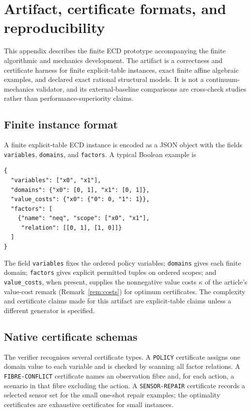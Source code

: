 \appendix
\section{Artifact, certificate formats, and reproducibility}
\label{app:artifact}

This appendix describes the finite ECD prototype accompanying the finite
algorithmic and mechanics development. The artifact is a correctness and
certificate harness for finite explicit-table instances, exact finite affine
algebraic examples, and declared exact rational structural models. It is not a
continuum-mechanics validator, and its external-baseline comparisons are
cross-check studies rather than performance-superiority claims.

\subsection{Finite instance format}

A finite explicit-table ECD instance is encoded as a JSON object with the fields
\texttt{variables}, \texttt{domains}, and \texttt{factors}. A typical Boolean
example is
\begin{verbatim}
{
  "variables": ["x0", "x1"],
  "domains": {"x0": [0, 1], "x1": [0, 1]},
  "value_costs": {"x0": {"0": 0, "1": 1}},
  "factors": [
    {"name": "neq", "scope": ["x0", "x1"],
     "relation": [[0, 1], [1, 0]]}
  ]
}
\end{verbatim}
The field \texttt{variables} fixes the ordered policy variables; \texttt{domains}
gives each finite domain; \texttt{factors} gives explicit permitted tuples on
ordered scopes; and \texttt{value\_costs}, when present, supplies the nonnegative
value costs \(\kappa\) of the article's value-cost remark (Remark~\ref{rem:costs})
for optimum certificates. The complexity and certificate claims made
for this artifact are explicit-table claims unless a different generator is
specified.

\subsection{Native certificate schemas}

The verifier recognises several certificate types. A \texttt{POLICY} certificate
assigns one domain value to each variable and is checked by scanning all factor
relations. A \texttt{FIBRE-CONFLICT} certificate names an observation fibre and,
for each action, a scenario in that fibre excluding the action. A
\texttt{SENSOR-REPAIR} certificate records a selected sensor set for the small
one-shot repair examples; the optimality certificates are exhaustive
certificates for small instances.

